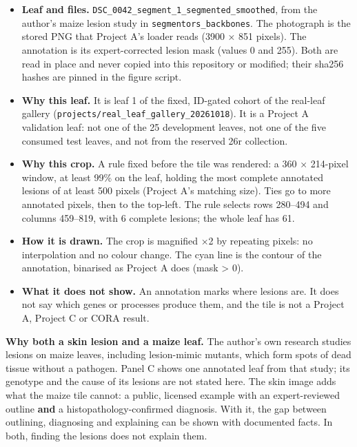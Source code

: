 \documentclass[11pt, a4paper]{article}
\begin{document}
\begin{itemize}
\item \textbf{Leaf and files.} \texttt{DSC\_0042\_segment\_1\_segmented\_smoothed}, from the author's maize lesion study in
\texttt{segmentors\_backbones}. The photograph is the stored PNG that Project A's loader reads (3900 × 851 pixels). The
annotation is its expert-corrected lesion mask (values 0 and 255). Both are read in place and never copied into this
repository or modified; their sha256 hashes are pinned in the figure script.
\item \textbf{Why this leaf.} It is leaf 1 of the fixed, ID-gated cohort of the real-leaf gallery
(\texttt{projects/real\_leaf\_gallery\_20261018}). It is a Project A validation leaf: not one of the 25 development leaves, not
one of the five consumed test leaves, and not from the reserved 26r collection.
\item \textbf{Why this crop.} A rule fixed before the tile was rendered: a 360 × 214-pixel window, at least 99\% on the leaf,
holding the most complete annotated lesions of at least 500 pixels (Project A's matching size). Ties go to more
annotated pixels, then to the top-left. The rule selects rows 280–494 and columns 459–819, with 6 complete lesions;
the whole leaf has 61.
\item \textbf{How it is drawn.} The crop is magnified ×2 by repeating pixels: no interpolation and no colour change. The cyan line
is the contour of the annotation, binarised as Project A does (mask > 0).
\item \textbf{What it does not show.} An annotation marks where lesions are. It does not say which genes or processes produce
them, and the tile is not a Project A, Project C or CORA result.
\end{itemize}

\textbf{Why both a skin lesion and a maize leaf.} The author's own research studies lesions on maize leaves, including
lesion-mimic mutants, which form spots of dead tissue without a pathogen. Panel C shows one annotated leaf from that
study; its genotype and the cause of its lesions are not stated here. The skin image adds what the maize tile cannot: a
public, licensed example with an expert-reviewed outline \textbf{and} a histopathology-confirmed diagnosis. With it, the gap
between outlining, diagnosing and explaining can be shown with documented facts. In both, finding the lesions does not
explain them.
\end{document}

